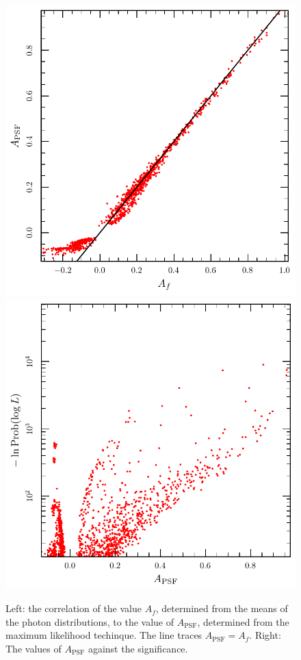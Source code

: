 \documentclass[useAMS,usenatbib]{mn2e}
\begin{document}
\begin{figure}
  \includegraphics[width=\columnwidth]{acorr}
  \includegraphics[width=\columnwidth]{asigcorr}
  \caption{Left: the correlation of the value $A_f$, determined from
    the means of the photon distributions, to the value of
    $A_\mathrm{PSF}$, determined from the maximum likelihood
    techinque.  The line traces $A_\mathrm{PSF}=A_f$. Right: The
    values of $A_\mathrm{PSF}$ against the significance.}
  \label{fig:acorr}
\end{figure}
\end{document}

